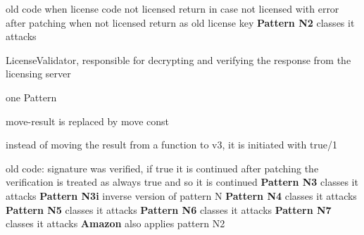 
old code when license code not licensed return in case not licensed with error
after patching when not licensed return as old license key
\newline
\newline
\textbf{Pattern N2}\newline
classes it attacks

LicenseValidator, responsible for decrypting and verifying the response from the licensing server

one Pattern



move-result is replaced by move const



instead of moving the result from a function to v3, it is initiated with true/1



old code: signature was verified, if true it is continued
after patching the verification is treated as always true and so it is continued
\newline
\newline
\textbf{Pattern N3}\newline
classes it attacks
\newline
\newline
\textbf{Pattern N3i}\newline
inverse version of pattern N
\newline
\newline
\textbf{Pattern N4}\newline
classes it attacks
\newline
\newline
\textbf{Pattern N5}\newline
classes it attacks
\newline
\newline
\textbf{Pattern N6}\newline
classes it attacks
\newline
\newline
\textbf{Pattern N7}\newline
classes it attacks
\newline
\newline
\textbf{Amazon}\newline
also applies pattern N2

